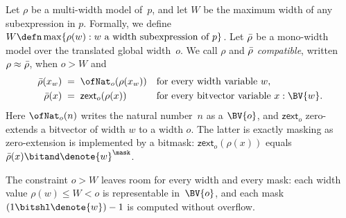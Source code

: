 \begin{definition}[Compatibility]\label{mwbv:def:compat}
Let $\rho$ be a multi-width model of~$p$, and let $W$ be the
  maximum width of any subexpression in $p$. Formally, we define $W \defn \max\{\rho(w) : w
\text{ a width subexpression of } p\}$.
  Let $\bar{\rho}$ be a mono-width model over the translated global width~$o$. We call
$\rho$ and $\bar{\rho}$ \emph{compatible}, written $\rho \approx \bar{\rho}$, when $o > W$
and
\begin{align*}
  \rhob(x_w) \;&=\; \ofNat_o(\rho(x_w)) && \text{for every width variable } w, \\
  \rhob(x)   \;&=\; \mathsf{zext}_o(\rho(x))     && \text{for every bitvector variable } x : \BV{w}.
\end{align*}
Here $\ofNat_o(n)$ writes the natural number~$n$ as a $\BV{o}$, and
$\mathsf{zext}_o$ zero-extends a bitvector of width $w$ to a width $o$.
The latter is exactly masking as zero-extension is implemented by a bitmask:
$\mathsf{zext}_o(\rho(x))$ equals $\rhob(x) \bitand \denote{w}^\mask$.
\end{definition}

The constraint $o > W$ leaves room for every width and every mask: each width
value $\rho(w) \le W < o$ is representable in~$\BV{o}$, and each mask $(1 \bitshl
\denote{w}) - 1$ is computed without overflow.

